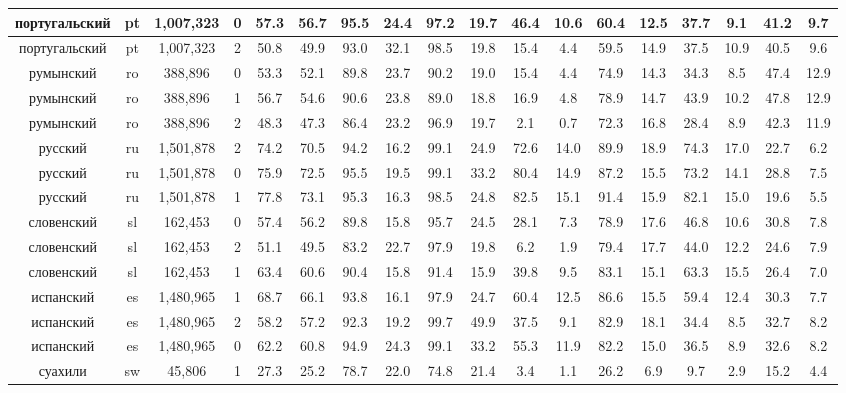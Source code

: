 \begin{table*}
{\begin{tabular}{|c|c|c|c||c|c|c|c|c|c|c|c|c|c|c|c|c|c|}
португальский & pt & 1,007,323 & 0 & 57.3 & 56.7 & 95.5 & 24.4 & 97.2 & 19.7 & 46.4 & 10.6 & 60.4 & 12.5 & 37.7 & 9.1 & 41.2 & 9.7\\ \hline
португальский & pt & 1,007,323 & 2 & 50.8 & 49.9 & 93.0 & 32.1 & 98.5 & 19.8 & 15.4 & 4.4 & 59.5 & 14.9 & 37.5 & 10.9 & 40.5 & 9.6\\ \hline
румынский & ro & 388,896 & 0 & 53.3 & 52.1 & 89.8 & 23.7 & 90.2 & 19.0 & 15.4 & 4.4 & 74.9 & 14.3 & 34.3 & 8.5 & 47.4 & 12.9\\ \hline
румынский & ro & 388,896 & 1 & 56.7 & 54.6 & 90.6 & 23.8 & 89.0 & 18.8 & 16.9 & 4.8 & 78.9 & 14.7 & 43.9 & 10.2 & 47.8 & 12.9\\ \hline
румынский & ro & 388,896 & 2 & 48.3 & 47.3 & 86.4 & 23.2 & 96.9 & 19.7 & 2.1 & 0.7 & 72.3 & 16.8 & 28.4 & 8.9 & 42.3 & 11.9\\ \hline
русский & ru & 1,501,878 & 2 & 74.2 & 70.5 & 94.2 & 16.2 & 99.1 & 24.9 & 72.6 & 14.0 & 89.9 & 18.9 & 74.3 & 17.0 & 22.7 & 6.2\\ \hline
русский & ru & 1,501,878 & 0 & 75.9 & 72.5 & 95.5 & 19.5 & 99.1 & 33.2 & 80.4 & 14.9 & 87.2 & 15.5 & 73.2 & 14.1 & 28.8 & 7.5\\ \hline
русский & ru & 1,501,878 & 1 & 77.8 & 73.1 & 95.3 & 16.3 & 98.5 & 24.8 & 82.5 & 15.1 & 91.4 & 15.9 & 82.1 & 15.0 & 19.6 & 5.5\\ \hline
словенский & sl & 162,453 & 0 & 57.4 & 56.2 & 89.8 & 15.8 & 95.7 & 24.5 & 28.1 & 7.3 & 78.9 & 17.6 & 46.8 & 10.6 & 30.8 & 7.8\\ \hline
словенский & sl & 162,453 & 2 & 51.1 & 49.5 & 83.2 & 22.7 & 97.9 & 19.8 & 6.2 & 1.9 & 79.4 & 17.7 & 44.0 & 12.2 & 24.6 & 7.9\\ \hline
словенский & sl & 162,453 & 1 & 63.4 & 60.6 & 90.4 & 15.8 & 91.4 & 15.9 & 39.8 & 9.5 & 83.1 & 15.1 & 63.3 & 15.5 & 26.4 & 7.0\\ \hline
испанский & es & 1,480,965 & 1 & 68.7 & 66.1 & 93.8 & 16.1 & 97.9 & 24.7 & 60.4 & 12.5 & 86.6 & 15.5 & 59.4 & 12.4 & 30.3 & 7.7\\ \hline
испанский & es & 1,480,965 & 2 & 58.2 & 57.2 & 92.3 & 19.2 & 99.7 & 49.9 & 37.5 & 9.1 & 82.9 & 18.1 & 34.4 & 8.5 & 32.7 & 8.2\\ \hline
испанский & es & 1,480,965 & 0 & 62.2 & 60.8 & 94.9 & 24.3 & 99.1 & 33.2 & 55.3 & 11.9 & 82.2 & 15.0 & 36.5 & 8.9 & 32.6 & 8.2\\ \hline
суахили & sw & 45,806 & 1 & 27.3 & 25.2 & 78.7 & 22.0 & 74.8 & 21.4 & 3.4 & 1.1 & 26.2 & 6.9 & 9.7 & 2.9 & 15.2 & 4.4\\ \hline

\end{tabular}}
\end{table*}
